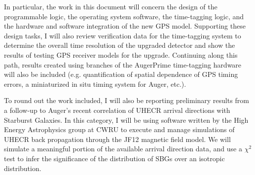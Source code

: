In particular, the work in this document will concern the design of the programmable logic, the operating system software, the time-tagging logic, and the hardware and software integration of the new GPS model. Supporting these design tasks, I will also review verification data for the time-tagging system to determine the overall time resolution of the upgraded detector and show the results of testing GPS receiver models for the upgrade. Continuing along this path, results created using branches of the AugerPrime time-tagging hardware will also be included (e.g. quantification of spatial dependence of GPS timing errors, a miniaturized in situ timing system for Auger\@TA, etc.).

To round out the work included, I will also be reporting preliminary results from a follow-up to Auger's recent correlation of UHECR arrival directions with Starburst Galaxies. In this category, I will be using software written by the High Energy Astrophysics group at CWRU to execute and manage simulations of UHECR back propagation through the JF12 magnetic field model. We will simulate a meaningful portion of the available arrival direction data, and use a $\chi^2$ test to infer the significance of the distribution of SBGs over an isotropic distribution.










